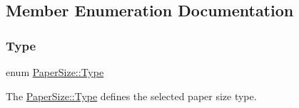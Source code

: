 \subsection{Member Enumeration Documentation}
\mbox{\label{classPaperSize_a0c3744aab15a171ac1681788f7169ed8}} 
\subsubsection{\texorpdfstring{Type}{Type}}
{\footnotesize\ttfamily enum \mbox{\hyperlink{classPaperSize_a0c3744aab15a171ac1681788f7169ed8}{Paper\+Size\+::\+Type}}}



The {\ttfamily \mbox{\hyperlink{classPaperSize_a0c3744aab15a171ac1681788f7169ed8}{Paper\+Size\+::\+Type}}} defines the selected paper size type. 

